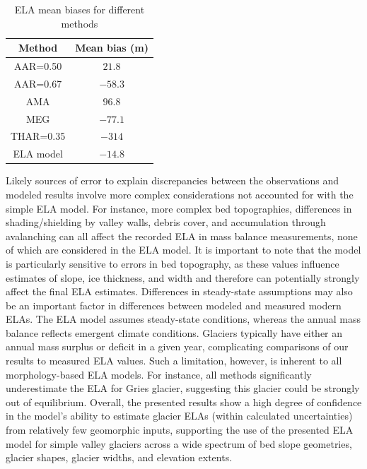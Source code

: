 \documentclass[review]{elsarticle}
\begin{document}
\begin{table}[]
    \centering
    \begin{tabular}{c|c}
        Method & Mean bias (m) \\
        \hline
        AAR=0.50 & $21.8$ \\
        AAR=0.67 & $-58.3$ \\
        AMA & $96.8$ \\
        MEG & $-77.1$ \\
        THAR=0.35 & $-314$ \\
        ELA model & $-14.8$
    \end{tabular}
    \caption{ELA mean biases for different methods}
    \label{tab:bias}
\end{table}

Likely sources of error to explain discrepancies between the observations and modeled results involve more complex considerations not accounted for with the simple ELA model.
For instance, more complex bed topographies, differences in shading/shielding by valley walls, debris cover, and accumulation through avalanching can all affect the recorded ELA in mass balance measurements, none of which are considered in the ELA model.
It is important to note that the model is particularly sensitive to errors in bed topography, as these values influence estimates of slope, ice thickness, and width and therefore can potentially strongly affect the final ELA estimates.
Differences in steady-state assumptions may also be an important factor in differences between modeled and measured modern ELAs.
The ELA model assumes steady-state conditions, whereas the annual mass balance reflects emergent climate conditions.
Glaciers typically have either an annual mass surplus or deficit in a given year, complicating comparisons of our results to measured ELA values.
Such a limitation, however, is inherent to all morphology-based ELA models.
For instance, all methods significantly underestimate the ELA for Gries glacier, suggesting this glacier could be strongly out of equilibrium.
Overall, the presented results show a high degree of confidence in the model's ability to estimate glacier ELAs (within calculated uncertainties) from relatively few geomorphic inputs, supporting the use of the presented ELA model for simple valley glaciers across a wide spectrum of bed slope geometries, glacier shapes, glacier widths, and elevation extents.
\end{document}
